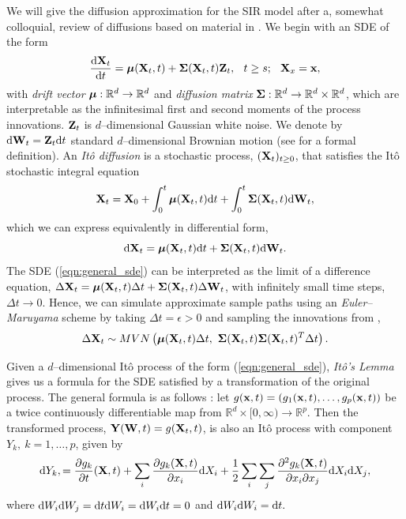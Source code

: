 {We will give the diffusion approximation for the SIR model after a, somewhat colloquial, review of diffusions based on material in \cite{fuchs2013inference,oksendal2003stochastic,wilkinson2011stochastic}. We begin with an SDE of the form \begin{equation}
\frac{\mathrm{d}\mathbf{X}_t}{\mathrm{d} t} = \boldsymbol{\mu}(\mathbf{X}_t,t) + \boldsymbol{\Sigma}(\mathbf{X}_t,t)\mathbf{Z}_t,\hspace{0.1in} t\geq s;\hspace{0.1in} \mathbf{X}_x = \mathbf{x},\end{equation}
with \textit{drift vector} $ \boldsymbol{\mu}:\mathbb{R}^d\rightarrow\mathbb{R}^d $ and  \textit{diffusion matrix} $ \boldsymbol{\Sigma}:\mathbb{R}^d\rightarrow \mathbb{R}^d\times\mathbb{R}^d $, which are interpretable as the infinitesimal first and second moments of the process innovations. $ \mathbf{Z}_t $ is $ d $--dimensional Gaussian white noise. We denote by $ \mathrm{d}\mathbf{W}_t = \mathbf{Z}_t\mathrm{d} t$ standard $ d $--dimensional Brownian motion (see \cite{oksendal2003stochastic} for a formal definition). An \textit{It\^{o} diffusion} is a stochastic process, $ (\mathbf{X}_t)_{t\geq0} $, that satisfies the It\^{o} stochastic integral equation
\begin{equation}
\mathbf{X}_t = \mathbf{X}_0 + \int_0^t\boldsymbol{\mu}(\mathbf{X}_t,t)\mathrm{d} t + \int_0^t\boldsymbol{\Sigma}(\mathbf{X}_t,t)\mathrm{d}\mathbf{W}_t,\end{equation}
which we can express equivalently in differential form,
\begin{equation}
\label{eqn:general_sde}
\mathrm{d}\mathbf{X}_t = \boldsymbol{\mu}(\mathbf{X}_t,t)\mathrm{d} t + \boldsymbol{\Sigma}(\mathbf{X}_t,t)\mathrm{d}\mathbf{W}_t.
\end{equation}
The SDE (\ref{eqn:general_sde}) can be interpreted as the limit of a difference equation, $ \Delta\mathbf{X}_t = \boldsymbol{\mu}(\mathbf{X}_t,t)\Delta t + \boldsymbol{\Sigma}(\mathbf{X}_t,t)\Delta\mathbf{W}_t $, with infinitely small time steps, $ \Delta t \rightarrow 0$. Hence, we can simulate approximate sample paths using an \textit{Euler--Maruyama} scheme by taking $ \Delta t = \epsilon>0 $ and sampling the innovations from ,
$$\Delta\bX_t\sim MVN\left (\bmu(\bX_t,t)\Delta t,\ \bSigma(\bX_t,t)\bSigma(\bX_t,t)^T\Delta t\right ).$$

Given a $ d $--dimensional It\^{o} process of the form (\ref{eqn:general_sde}), \textit{It\^{o}'s Lemma} gives us a formula for the SDE satisfied by a transformation of the original process. The general formula is as follows \cite{oksendal2003stochastic}: let $ g(\mathbf{x}, t) = \left (g_1(\mathbf{x},t),\dots,g_p(\mathbf{x},t)\right ) $ be a twice continuously differentiable map from $ \mathbb{R}^d\times[0,\infty)\rightarrow\mathbb{R}^p $. Then the transformed process, $ \mathbf{Y}(\mathbf{W},t) = g(\mathbf{X}_t, t)$, is also an It\^{o} process with component $ Y_k,\ k=1,\dots,p $, given by
$$\mathrm{d} Y_k, = \frac{\partial g_k}{\partial t}(\mathbf{X}, t) + \sum_i\frac{\partial g_k(\mathbf{X},t)}{\partial x_i}\mathrm{d} X_i + \frac{1}{2}\sum_i\sum_j\frac{\partial^2g_k(\mathbf{X},t)}{\partial x_i\partial x_j}\mathrm{d} X_i\mathrm{d} X_j,$$
where $ \mathrm{d} W_i\mathrm{d} W_j = \mathrm{d} t\mathrm{d} W_i = \mathrm{d} W_i\mathrm{d} t = 0 $ and $ \mathrm{d} W_i\mathrm{d} W_i = \mathrm{d} t. $

}
